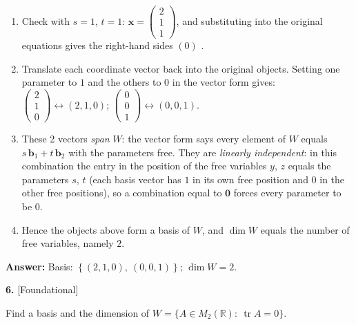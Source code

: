 \documentclass[11pt]{article}
\begin{document}
\begin{tcolorbox}[breakable,colback=ans,colframe=ansb,boxrule=0.5pt,left=4pt,right=4pt,top=2pt,bottom=2pt]
\begin{enumerate}[leftmargin=3.1em,itemsep=1pt,topsep=1pt,label=\textbf{Step \arabic*.}]
\item Check with $s=1$, $t=1$: $\mathbf x=\begin{pmatrix}2\\1\\1\end{pmatrix}$, and substituting into the original equations gives the right-hand sides $(0)$ \checkmark.
\item Translate each coordinate vector back into the original objects. Setting one parameter to $1$ and the others to $0$ in the vector form gives: $\begin{pmatrix}2\\1\\0\end{pmatrix}\leftrightarrow (2,1,0)$; $\begin{pmatrix}0\\0\\1\end{pmatrix}\leftrightarrow (0,0,1)$.
\item These 2 vectors \emph{span} $W$: the vector form says every element of $W$ equals $s\,\mathbf b_1+t\,\mathbf b_2$ with the parameters free. They are \emph{linearly independent}: in this combination the entry in the position of the free variables $y$, $z$ equals the parameters $s$, $t$ (each basis vector has $1$ in its own free position and $0$ in the other free positions), so a combination equal to $\mathbf 0$ forces every parameter to be $0$.
\item Hence the objects above form a basis of $W$, and $\dim W$ equals the number of free variables, namely $2$.
\end{enumerate}\textbf{Answer:} Basis: $\left\{(2,1,0),\ (0,0,1)\right\}$; $\dim W=2$.\end{tcolorbox}
\par\vspace{2pt}
\begin{minipage}{\linewidth}\textbf{6.} \hfill{\scriptsize\color{ink}[Foundational]}\par\nopagebreak Find a basis and the dimension of $W=\{A\in M_2(\mathbb{R}):\ \operatorname{tr}A=0\}$.
\end{minipage}\par\nopagebreak
\end{document}
